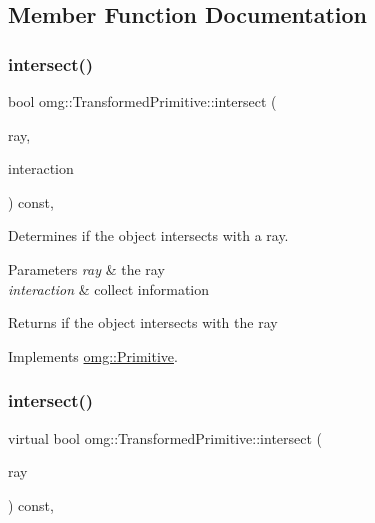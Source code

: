 \subsection{Member Function Documentation}
\mbox{\label{classomg_1_1_transformed_primitive_ab2ec675cf03eb5b8e59679c737e12ec4}} 
\subsubsection{\texorpdfstring{intersect()}{intersect()}\hspace{0.1cm}{\footnotesize\ttfamily [1/2]}}
{\footnotesize\ttfamily bool omg\+::\+Transformed\+Primitive\+::intersect (\begin{DoxyParamCaption}\item[{const \mbox{\hyperlink{classomg_1_1_ray}{Ray}} \&}]{ray,  }\item[{\mbox{\hyperlink{classomg_1_1_surface_interaction}{Surface\+Interaction}} $\ast$}]{interaction }\end{DoxyParamCaption}) const\hspace{0.3cm}{\ttfamily [inline]}, {\ttfamily [virtual]}}



Determines if the object intersects with a ray. 


\begin{DoxyParams}{Parameters}
{\em ray} & the ray \\
\hline
{\em interaction} & collect information \\
\hline
\end{DoxyParams}
\begin{DoxyReturn}{Returns}
if the object intersects with the ray 
\end{DoxyReturn}


Implements \mbox{\hyperlink{classomg_1_1_primitive_a51f78d3f52794ae02e18688dff75414c}{omg\+::\+Primitive}}.

\mbox{\label{classomg_1_1_transformed_primitive_a74303debd3737dd5d73de33507e36ecf}} 
\subsubsection{\texorpdfstring{intersect()}{intersect()}\hspace{0.1cm}{\footnotesize\ttfamily [2/2]}}
{\footnotesize\ttfamily virtual bool omg\+::\+Transformed\+Primitive\+::intersect (\begin{DoxyParamCaption}\item[{const \mbox{\hyperlink{classomg_1_1_ray}{Ray}} \&}]{ray }\end{DoxyParamCaption}) const\hspace{0.3cm}{\ttfamily [inline]}, {\ttfamily [virtual]}}



